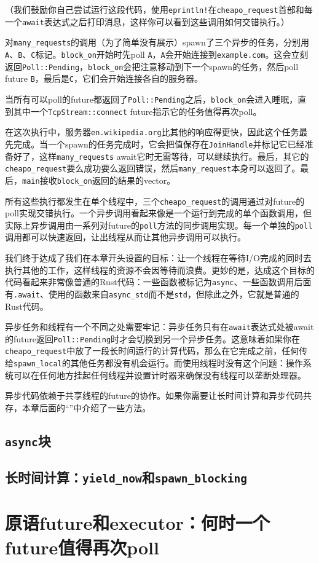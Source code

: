（我们鼓励你自己尝试运行这段代码，使用\texttt{eprintln!}在\texttt{cheapo\_request}首部和每一个\texttt{await}表达式之后打印消息，这样你可以看到这些调用如何交错执行。）

对\texttt{many\_requests}的调用（为了简单没有展示）spawn了三个异步的任务，分别用\texttt{A}、\texttt{B}、\texttt{C}标记。\texttt{block\_on}开始时先poll \texttt{A}，\texttt{A}会开始连接到\texttt{example.com}。这会立刻返回\texttt{Poll::Pending}，\texttt{block\_on}会把注意移动到下一个spawn的任务，然后poll future \texttt{B}，最后是\texttt{C}，它们会开始连接各自的服务器。

当所有可以poll的future都返回了\texttt{Poll::Pending}之后，\texttt{block\_on}会进入睡眠，直到其中一个\texttt{TcpStream::connect} future指示它的任务值得再次poll。

在这次执行中，服务器\texttt{en.wikipedia.org}比其他的响应得更快，因此这个任务最先完成。当一个spawn的任务完成时，它会把值保存在\texttt{JoinHandle}并标记它已经准备好了，这样\texttt{many\_requests} await它时无需等待，可以继续执行。最后，其它的\texttt{cheapo\_request}要么成功要么返回错误，然后\texttt{many\_request}本身可以返回了。最后，\texttt{main}接收\texttt{block\_on}返回的结果的vector。

所有这些执行都发生在单个线程中，三个\texttt{cheapo\_request}的调用通过对future的poll实现交错执行。一个异步调用看起来像是一个运行到完成的单个函数调用，但实际上异步调用由一系列对future的\texttt{poll}方法的同步调用实现。每一个单独的\texttt{poll}调用都可以快速返回，让出线程从而让其他异步调用可以执行。

我们终于达成了我们在本章开头设置的目标：让一个线程在等待I/O完成的同时去执行其他的工作，这样线程的资源不会因等待而浪费。更妙的是，达成这个目标的代码看起来非常像普通的Rust代码：一些函数被标记为\texttt{async}、一些函数调用后面有\texttt{.await}、使用的函数来自\texttt{async\_std}而不是\texttt{std}，但除此之外，它就是普通的Rust代码。

异步任务和线程有一个不同之处需要牢记：异步任务只有在\texttt{await}表达式处被await的future返回\texttt{Poll::Pending}时才会切换到另一个异步任务。这意味着如果你在\texttt{cheapo\_request}中放了一段长时间运行的计算代码，那么在它完成之前，任何传给\texttt{spawn\_local}的其他任务都没有机会运行。而使用线程时没有这个问题：操作系统可以在任何地方挂起任何线程并设置计时器来确保没有线程可以垄断处理器。

异步代码依赖于共享线程的future的协作。如果你需要让长时间计算和异步代码共存，本章后面的“”中介绍了一些方法。

\subsection{\texttt{async}块}


\subsection{长时间计算：\texttt{yield\_now}和\texttt{spawn\_blocking}}\label{LongCompute}

\section{原语future和executor：何时一个future值得再次poll}\label{WhenPoll}
